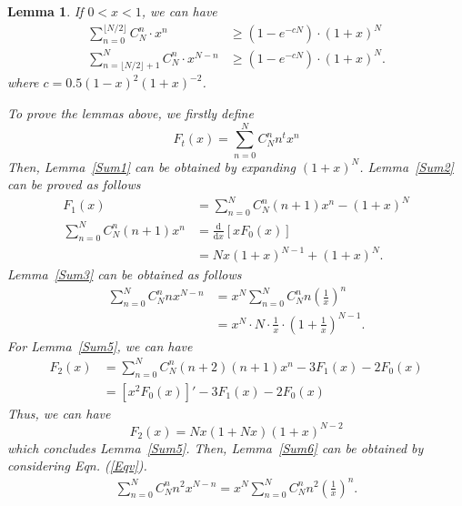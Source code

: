 \documentclass{article}
\makeatletter
\newcounter{lemmas}
\newtheorem{lemma}[lemmas]{Lemma}
\renewenvironment{proof}[1][\proofname]{\par
  \vspace{-\topsep}%
  \pushQED{\qed}%
  \normalfont
  \topsep0pt \partopsep0pt %
  \trivlist
  \item[\hskip\labelsep
        \itshape
    #1\@addpunct{.}]\ignorespaces
}{%
  \popQED\endtrivlist\@endpefalse
  \addvspace{0pt plus 0pt} %
}
\makeatother
\begin{document}
\begin{lemma}
\label{Sum4}
If $0<x<1$, we can have
\begin{equation*}
\begin{split}
\sum_{n=0}^{\lfloor N/2\rfloor} C_N^{n}\cdot x^{n} &\geq \left(1-e^{-cN}\right) \cdot (1+x)^{N}\\
\sum_{n=\lfloor N/2 \rfloor +1}^{N} C_N^{n}\cdot x^{N-n}&\geq \left(1-e^{-cN}\right) \cdot (1+x)^{N}.
\end{split}
\end{equation*}
where $c=0.5(1-x)^2(1+x)^{-2}$.
\begin{proof}
To prove the lemmas above, we firstly define
\begin{equation}
F_t(x)=\sum_{n=0}^{N} C_N^{n} n^t x^{n}
\end{equation}
Then, Lemma~\ref{Sum1} can be obtained by expanding $(1+x)^N$.
Lemma~\ref{Sum2} can be proved as follows
\begin{equation}
\begin{split}
F_1(x)&=\sum_{n=0}^{N} C_N^{n} (n+1) x^{n}-(1+x)^N\\
\sum_{n=0}^{N} C_N^{n} (n+1) x^{n}&=\frac{\mathrm{d}}{\mathrm{d}x}\left[xF_0(x)\right]\\
&=Nx(1+x)^{N-1}+(1+x)^N.
\end{split}
\end{equation}
Lemma~\ref{Sum3} can be obtained as follows
\begin{equation}
\begin{split}
\sum_{n=0}^{N} C_N^{n} n x^{N-n}&=x^N\sum_{n=0}^{N} C_N^{n} n \left(\frac{1}{x}\right)^n\\
&=x^N\cdot N\cdot \frac{1}{x}\cdot \left(1+\frac{1}{x}\right)^{N-1}.
\end{split}
\end{equation}
For Lemma~\ref{Sum5}, we can have
\begin{align}
F_2(x)&=\sum_{n=0}^{N} C_N^{n} (n+2)(n+1) x^{n}-3F_{1}(x)-2F_{0}(x)\nonumber \\
&=\left[x^2F_0(x)\right]' -3F_{1}(x)-2F_{0}(x)
\end{align}
Thus, we can have
\begin{equation}
F_2(x)=Nx(1+Nx)(1+x)^{N-2}
\end{equation}
which concludes Lemma~\ref{Sum5}.
Then, Lemma~\ref{Sum6} can be obtained by considering Eqn. (\ref{Eqv}).
\begin{equation}
\label{Eqv}
\begin{split}
\sum_{n=0}^{N} C_N^{n} n^2 x^{N-n}=x^N\sum_{n=0}^{N} C_N^{n} n^2 \left(\frac{1}{x}\right)^n.

\end{split}
\end{equation}
\end{proof}
\end{lemma}
\end{document}
